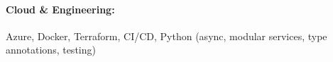 \documentclass[10pt, letterpaper]{article}
\newenvironment{highlights}{
    \begin{itemize}[
        topsep=0.10 cm,
        parsep=0.10 cm,
        partopsep=0pt,
        itemsep=0pt,
        leftmargin=0 cm + 10pt
    ]
}{
    \end{itemize}
} %
\newenvironment{onecolentry}{
    \begin{adjustwidth}{
        0 cm + 0.00001 cm
    }{
        0 cm + 0.00001 cm
    }
}{
    \end{adjustwidth}
} %
\begin{document}
        \paragraph{Cloud \& Engineering:} Azure, Docker, Terraform, CI/CD, Python (async, modular services, type annotations, testing)

    
        



    
    
    


    
\end{document}
